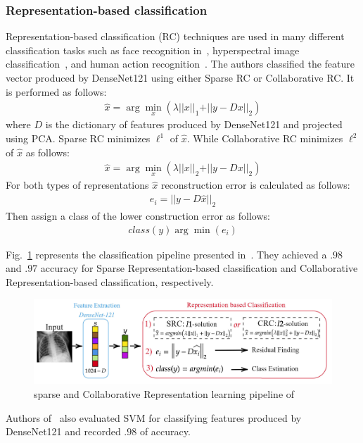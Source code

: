\subsubsection{Representation-based classification}
 Representation-based classification (RC) techniques are used in many different classification tasks such as face recognition in~\cite{wright2010sparse}, hyperspectral image classification~\cite{li2016survey}, and human action recognition~\cite{guha2011learning}. The authors classified the feature vector produced by DenseNet121 using either Sparse RC or Collaborative RC. It is performed as follows\cite{ar}:
 \begin{equation}
    \begin{split}
        \hat{x} = \arg \min_{x}(\lambda \vert \vert x \vert\vert_{1} + \vert\vert y - Dx \vert\vert_{2})
    \end{split}
\end{equation}
where $D$ is the dictionary of features produced by DenseNet121 and projected using PCA. Sparse RC minimizes $\ell^{1}$ of $\hat{x}$. While Collaborative RC minimizes $\ell^{2}$ of $\hat{x}$ as follows:
\begin{equation}
    \begin{split}
        \hat{x} = \arg \min_{x}(\lambda \vert \vert x \vert\vert_{2} + \vert\vert y - Dx \vert\vert_{2})
    \end{split}
\end{equation}
For both types of representations $\hat{x}$ reconstruction error is calculated as follows:
\begin{equation}
    \begin{split}
        e_i = \vert\vert y - D\hat{x} \vert\vert_2
    \end{split}
\end{equation}
Then assign a class of the lower construction error as follows:
\begin{equation}
    \begin{split}
        class(y) \arg \min(e_i)
    \end{split}
\end{equation}

Fig.~\ref{fig:RC} represents the classification pipeline presented in~\cite{ar}. They achieved a $.98$ and $.97$ accuracy for Sparse Representation-based classification and Collaborative Representation-based classification, respectively. 
\begin{figure}
    \centering
    \includegraphics[width=\textwidth]{Figures/RCpipline.png}
    \caption{\label{fig:RC} sparse and Collaborative Representation learning pipeline of~\cite{ar}}
\end{figure}
Authors of~\cite{ar} also evaluated SVM for classifying features produced by DenseNet121 and recorded $.98$ of accuracy.

